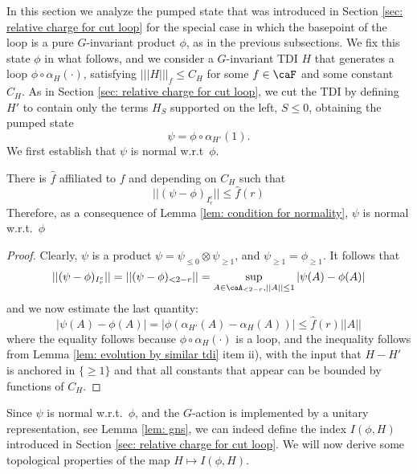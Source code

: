 In this section we analyze the pumped state that was introduced in Section \ref{sec: relative charge for cut loop} for the special case in which the basepoint of the loop is a pure $G$-invariant product $\phi$, as in the previous subsections. 
We fix this state $\phi$ in what follows, and we consider a $G$-invariant TDI $H$ that generates a loop $\phi\circ\alpha_H(\cdot)$, satisfying  $|||H|||_f\leq C_H$ for some $f\in\caF$ and some constant $C_H$.  As in Section \ref{sec: relative charge for cut loop}, 
we cut the TDI by defining $H'$ to contain only the terms $H_S$ supported on the left, $S \leq 0$,  obtaining the pumped state
\begin{equation}\label{eq: pumped state}
	\psi= \phi\circ \alpha_{H'}(1).
\end{equation}
We first establish that $\psi$ is normal w.r.t\ $\phi$.
\begin{lemma}\label{lem: cut state}
	There is $\hat{f}$ affiliated to $f$ and depending on $C_H$ such that 
	\begin{equation}\label{eq: two-sided bound}
		|| (\psi-\phi)_{I_r^c} || \leq  \hat{f}(r)
	\end{equation}
	Therefore, as a consequence of Lemma \ref{lem: condition for normality}, $\psi$ is normal w.r.t.\ $\phi$
\end{lemma}
\begin{proof}
	Clearly, $\psi$ is a product $\psi=\psi_{\leq 0}\otimes \psi_{\geq 1}$, and $\psi_{\geq 1}=\phi_{\geq 1}$. It follows that 
	$$
	||(\psi-\phi)_{I_r^c} ||= || (\psi-\phi)_{<2-r} ||=\sup_{A \in\caA_{<2-r}, ||A|| \leq 1}  |\psi(A)-\phi(A)|
	$$
	and we now estimate the last quantity:
	\begin{equation}
		| \psi(A) - \phi(A)| =|\phi( \alpha_{H'}(A) - \alpha_H(A)) | \leq  \hat{f}(r) ||A||
		\label{eq: onesided bound}
	\end{equation}
	where the equality follows because  $\phi\circ\alpha_{H}(\cdot)$ is a loop,
	and the inequality follows from Lemma \ref{lem: evolution by similar tdi} item ii), with the input that $H-H'$ is anchored in $\{\geq 1\}$ and that all constants that appear can be bounded by functions of $C_H$.  
\end{proof}

Since $\psi$ is normal w.r.t.\ $\phi$, and the $G$-action is implemented by a unitary representation, see Lemma \ref{lem: gns},  we can indeed define the index $I(\phi,H)$ introduced in Section \ref{sec: relative charge for cut loop}.  We will now derive some topological properties of the map $H\mapsto I(\phi,H) $.






